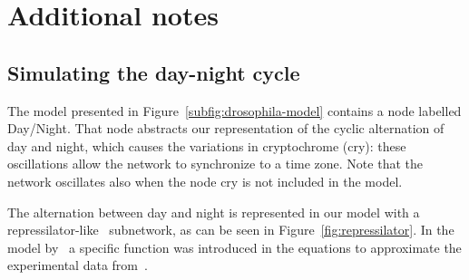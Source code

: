 \clearpage
\section{Additional notes}

\subsection{Simulating the day-night cycle}\label{suppl:repressilator}
The model presented in Figure~\ref{subfig:drosophila-model} contains a node
labelled {\sf Day/Night}. That node abstracts our representation
of the cyclic alternation of day and night, which causes the variations
in cryptochrome ({\sf cry}): these oscillations allow the network
to synchronize to a time zone. Note that the network oscillates
also when the node {\sf cry} is not included in the model.

The alternation between day and night is represented in our model with a
repressilator-like~\citep{repressilator} subnetwork, as can be seen in Figure~\ref{fig:repressilator}.
In the model by~\cite{drosophila-ode-model} a specific function
was introduced in the equations to approximate the experimental data from~\cite{drosophila-cry-data}.

